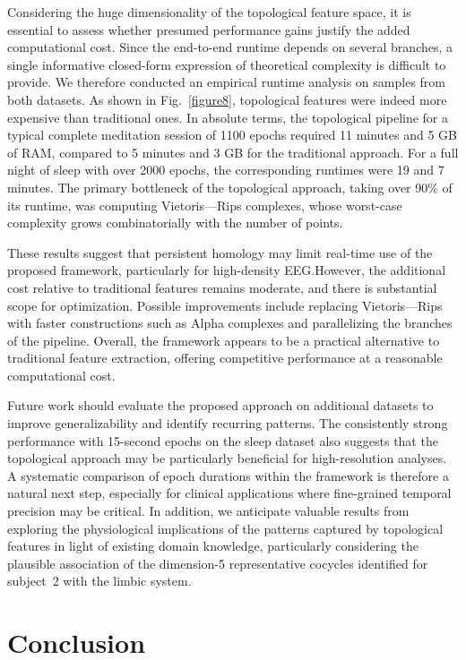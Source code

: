 \documentclass[pdflatex,sn-basic,Numbered]{sn-jnl}
\begin{document}
Considering the huge dimensionality of the topological feature space, it is essential to assess whether presumed performance gains justify the added computational cost. Since the end-to-end runtime depends on several branches, a single informative closed-form expression of theoretical complexity is difficult to provide. We therefore conducted an empirical runtime analysis on samples from both datasets. As shown in Fig.~\ref{figure8}, topological features were indeed more expensive than traditional ones. In absolute terms, the topological pipeline for a typical complete meditation session of 1100 epochs required 11 minutes and 5 GB of RAM, compared to 5 minutes and 3 GB for the traditional approach. For a full night of sleep with over 2000 epochs, the corresponding runtimes were 19 and 7 minutes. The primary bottleneck of the topological approach, taking over 90\% of its runtime, was computing Vietoris---Rips complexes, whose worst-case complexity grows combinatorially with the number of points.

These results suggest that persistent homology may limit real-time use of the proposed framework, particularly for high-density EEG.\@ However, the additional cost relative to traditional features remains moderate, and there is substantial scope for optimization. Possible improvements include replacing Vietoris---Rips with faster constructions such as Alpha complexes and parallelizing the branches of the pipeline. Overall, the framework appears to be a practical alternative to traditional feature extraction, offering competitive performance at a reasonable computational cost.

Future work should evaluate the proposed approach on additional datasets to improve generalizability and identify recurring patterns. The consistently strong performance with 15-second epochs on the sleep dataset also suggests that the topological approach may be particularly beneficial for high-resolution analyses. A systematic comparison of epoch durations within the framework is therefore a natural next step, especially for clinical applications where fine-grained temporal precision may be critical. In addition, we anticipate valuable results from exploring the physiological implications of the patterns captured by topological features in light of existing domain knowledge, particularly considering the plausible association of the dimension-5 representative cocycles identified for subject~2 with the limbic system.

\section{Conclusion}
\end{document}
